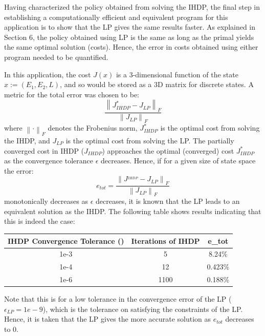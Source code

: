 \documentclass[conference]{IEEEtran}
\newcommand{\norm}[1]{\left\lVert#1\right\rVert}
\begin{document}
Having characterized the policy obtained from solving the IHDP, the final step in establishing a computationally efficient and equivalent program for this application is to show that the LP gives the same results faster. As explained in Section 6, the policy obtained using LP is the same as long as the primal yields the same optimal solution (costs). Hence, the error in costs obtained using either program needed to be quantified.

In this application, the cost $J(x)$ is a 3-dimensional function of the state $x:=(E_{1},E_{2},L)$, and so would be stored as a 3D matrix for discrete states. A metric for the total error was chosen to be:
\begin{displaymath}
    \frac{\norm{J^{*}_{IHDP}-J_{LP}}_{F}}{\norm{J_{LP}}_{F}}
\end{displaymath} where $\norm{\cdot}_{F}$ denotes the Frobenius norm, $J^{*}_{IHDP}$ is the optimal cost from solving the IHDP, and $J_{LP}$ is the optimal cost from solving the LP. The partially converged cost in IHDP ($J_{IHDP}$) approaches the optimal (converged) cost $J^{*}_{IHDP}$ as the convergence tolerance $\epsilon$ decreases. Hence, if for a given size of state space the error:
\begin{displaymath}
    e_{tot}=\frac{\norm{J^_{IHDP}-J_{LP}}_{F}}{\norm{J_{LP}}_{F}}
\end{displaymath} monotonically decreases as $\epsilon$ decreases, it is known that the LP leads to an equivalent solution as the IHDP. The following table shows results indicating that this is indeed the case:
\begin{table}[htbp]
	\begin{center}
		\begin{tabular}{|c|c|c|}
			\hline
			\textbf{IHDP Convergence Tolerance (\epsilon)}&\textbf{Iterations of IHDP}&\textbf{e_{tot}} \\
			\hline
			1e-3& 5 & 8.24\% \\
			\hline
			1e-4& 12 & 0.423\% \\
			\hline
			1e-6& 1100 & 0.188\% \\
			\hline
		\end{tabular}
		\label{tab1}
	\end{center}
\end{table} Note that this is for a low tolerance in the convergence error of the LP ($\epsilon_{LP}=1e-9$), which is the tolerance on satisfying the constraints of the LP. Hence, it is taken that the LP gives the more accurate solution as $e_{tot}$ decreases to 0.
\end{document}

